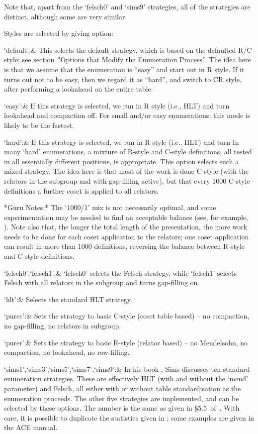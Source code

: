 Note that, apart from the `felsch0' and `sims9' strategies, all of the
strategies are distinct, although some are very similar.

Styles are selected by giving option:

\beginitems
`default':&
This selects the default strategy, which is based on the defaulted R/C
style; see section~"Options that Modify the Enumeration Process".  The idea
here is that we assume that the enumeration is ``easy'' and start out in R
style.  If it turns out not to be easy, then we regard it as ``hard'', and
switch to CR style, after performing a lookahead on the entire table.

`easy':&
If this strategy is selected, we run in R style (i.e., HLT) and turn
lookahead and compaction off.  For small and/or easy enumerations, this mode
is likely to be the fastest.

`hard':&
If this strategy is selected, we run in R style (i.e., HLT) and turn In many
`hard' enumerations, a mixture of R-style and C-style definitions, all
tested in all essentially different positions, is appropriate.  This option
selects such a mixed strategy.  The idea here is that most of the work is
done C-style (with the relators in the subgroup and with gap-filling
active), but that every $1000$ C-style definitions a further coset is
applied to all relators.

*Guru Notes:*
The `1000/1' mix is not necessarily optimal, and some
  experimentation may be needed to find an acceptable balance (see, for
  example, \cite{HR1}).
Note also that, the longer the total length of the presentation, the more
  work needs to be done for each coset application to the relators; one
  coset application can result in more than $1000$ definitions, reversing
  the balance between R-style and C-style definitions.

`felsch0',`felsch1':&
`felsch0' selects the Felsch strategy, while `felsch1' selects Felsch with all
relators in the subgroup and turns gap-filling on.

`hlt':&
Selects the standard HLT strategy.

`purec':&
Sets the strategy to basic C-style (coset table based) -- no compaction, no
gap-filling, no relators in subgroup.

`purer':&
Sets the strategy to basic R-style (relator based) -- no Mendelsohn, no
compaction, no lookahead, no row-filling.

`sims1',`sims3',`sims5',`sims7',`sims9':&
In his book \cite{Sim}, Sims discusses ten standard enumeration strategies.
These are effectively HLT (with and without the `mend' parameter) and
Felsch, all either with or without table standardisation as the enumeration
proceeds.
The other five strategies are implemented, and can be selected by these
options.  The number is the same as given in \S5.5~of~\cite{Sim}.  With
care, it is possible to duplicate the statistics given in \cite{Sim}; some
examples are given in the ACE manual.

